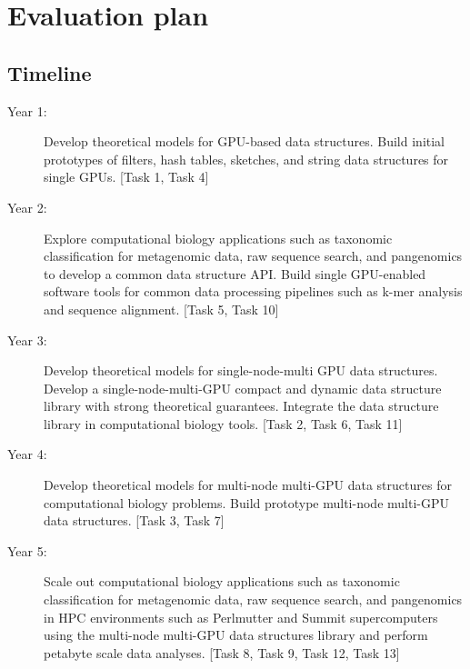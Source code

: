 \section{Evaluation plan}


\subsection{Timeline}
\begin{description}
\item [Year 1:] Develop theoretical models for GPU-based data structures. Build initial prototypes of filters, hash tables, sketches, and string data structures for single GPUs. [Task 1, Task 4]

\item [Year 2:] Explore computational biology applications such as taxonomic classification for metagenomic data, raw sequence search, and pangenomics to develop a common data structure API. Build single GPU-enabled software tools for common data processing pipelines such as k-mer analysis and sequence alignment. [Task 5, Task 10]

\item [Year 3:] Develop theoretical models for single-node-multi GPU data structures. Develop a single-node-multi-GPU compact and dynamic data structure library with strong theoretical guarantees. Integrate the data structure library in computational biology tools. [Task 2, Task 6, Task 11]

\item [Year 4:] Develop theoretical models for multi-node multi-GPU data structures for computational biology problems. Build prototype multi-node multi-GPU data structures. [Task 3, Task 7]

\item [Year 5:] Scale out computational biology applications such as taxonomic classification for metagenomic data, raw sequence search, and pangenomics in HPC environments such as Perlmutter and Summit supercomputers using the multi-node multi-GPU data structures library and perform petabyte scale data analyses. [Task 8, Task 9, Task 12, Task 13]
\end{description}



